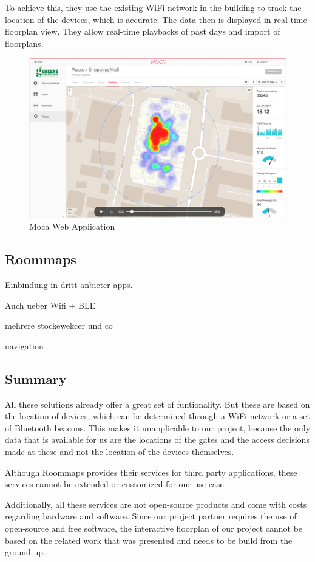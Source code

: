 To achieve this, they use the existing WiFi network in the building to track the location of the devices, which is accurate. The data then is displayed in real-time floorplan view. They allow real-time playbacks of past days and import of floorplans.

\begin{figure}[!hb]
	\centering
	\includegraphics[width=0.9\linewidth]{images/Moca}
	\caption{Moca Web Application}
	\label{fig:InfsoftApplication}
\end{figure}

\subsection{Roommaps}

Einbindung in dritt-anbieter apps.

Auch ueber Wifi + BLE

mehrere stockewekcer und co

navigation

\subsection{Summary}

All these solutions already offer a great set of funtionality. But these are based on the location of devices, which can be determined through a WiFi network or a set of Bluetooth beacons. This makes it unapplicable to our project, because the only data that is available for us are the locations of the gates and the access decisions made at these and not the location of the devices themselves.

Although Roommaps provides their services for third party applications, these services cannot be extended or customized for our use case. 

Additionally, all these services are not open-source products and come with costs regarding hardware and software. Since our project partner requires the use of open-source and free software, the interactive floorplan of our project cannot be based on the related work that was presented and needs to be build from the ground up.

\clearpage